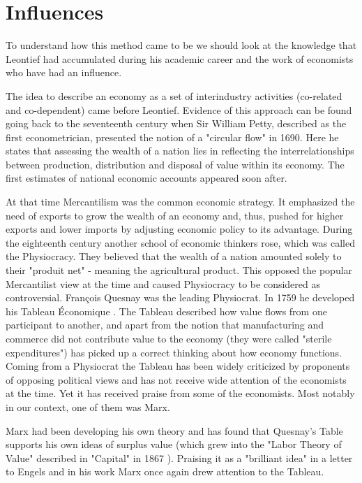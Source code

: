\documentclass[12pt,a4paper]{scrartcl}
\begin{document}
	\section{Influences} \label{influences}
	
	To understand how this method came to be we should look at the knowledge that Leontief had accumulated during his academic career and the work of economists who have had an influence. 
	
	The idea to describe an economy as a set of interindustry activities (co-related and co-dependent) came before Leontief. Evidence of this approach can be found going back to the seventeenth century when Sir William Petty, described as the first econometrician, presented the notion of a "circular flow" in 1690. Here he states that assessing the wealth of a nation lies in reflecting the interrelationships between production, distribution and disposal of value within its economy. The first estimates of national economic accounts appeared soon after.
	
	At that time Mercantilism was the common economic strategy. It emphasized the need of exports to grow the wealth of an economy and, thus, pushed for higher exports and lower imports by adjusting economic policy to its advantage. During the eighteenth century another school of economic thinkers rose, which was called the Physiocracy. They believed that the wealth of a nation amounted solely to their "produit net" - meaning the agricultural product. This opposed the popular Mercantilist view at the time and caused Physiocracy to be considered as controversial. François Quesnay was the leading Physiocrat. In 1759 he developed his Tableau Économique \cite[p.727]{Miller2009}. The Tableau described how value flows from one participant to another, and apart from the notion that manufacturing and commerce did not contribute value to the economy (they were called "sterile expenditures") has picked up a correct thinking about how economy functions. Coming from a Physiocrat the Tableau has been widely criticized by proponents of opposing political views and has not receive wide attention of the economists at the time. Yet it has received praise from some of the economists. Most notably in our context, one of them was Marx. \cite[pp.724-732]{Miller2009}
	
	Marx had been developing his own theory and has found that Quesnay's Table supports his own ideas of surplus value (which grew into the "Labor Theory of Value" described in "Capital" in 1867 \cite[]{Marx1887}). Praising it as a "brilliant idea" in a letter to Engels \cite[p.144]{Baumol2000} and in his work Marx once again drew attention to the Tableau.
	
\end{document}

